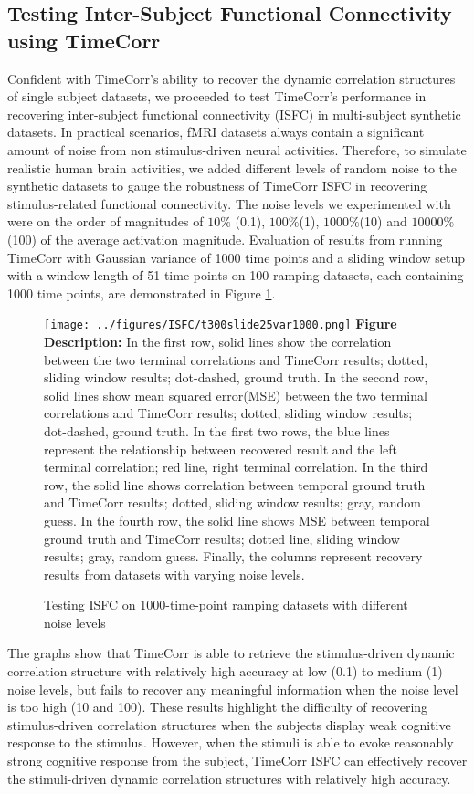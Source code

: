 \documentclass[11pt]{article}
\begin{document}
\subsection{Testing Inter-Subject Functional Connectivity using TimeCorr}
Confident with TimeCorr's ability to recover the dynamic correlation structures of single subject datasets, we proceeded to test TimeCorr's performance in recovering inter-subject functional connectivity (ISFC) in multi-subject synthetic datasets. In practical scenarios, fMRI datasets always contain a significant amount of noise from non stimulus-driven neural activities. Therefore, to simulate realistic human brain activities, we added different levels of random noise to the synthetic datasets to gauge the robustness of TimeCorr ISFC in recovering stimulus-related functional connectivity. The noise levels we experimented with were on the order of magnitudes of $10\%$ (0.1), $100\%$(1), $1000\%$(10) and $10000\%$(100) of the average activation magnitude. Evaluation of results from running TimeCorr with Gaussian variance of 1000 time points and a sliding window setup with a window length of 51 time points on 100 ramping datasets, each containing 1000 time points, are demonstrated in Figure \ref{fig:t300slide25var1000}.

\begin{figure}[!htb]
\caption{Testing ISFC on 1000-time-point ramping datasets with different noise levels}
\texttt{[image: ../figures/ISFC/t300slide25var1000.png]}
\label{fig:t300slide25var1000}
\small{\textbf{Figure Description:} In the first row, solid lines show the correlation between the two terminal correlations and TimeCorr results; dotted, sliding window results; dot-dashed, ground truth. In the second row, solid lines show mean squared error(MSE) between the two terminal correlations and TimeCorr results; dotted, sliding window results; dot-dashed, ground truth. In the first two rows, the blue lines represent the relationship between recovered result and the left terminal correlation; red line, right terminal correlation. In the third row, the solid line shows correlation between temporal ground truth and TimeCorr results; dotted, sliding window results; gray, random guess. In the fourth row, the solid line shows MSE between temporal ground truth and TimeCorr results; dotted line, sliding window results; gray, random guess. Finally, the columns represent recovery results from datasets with varying noise levels.}
\end{figure}

The graphs show that TimeCorr is able to retrieve the stimulus-driven dynamic correlation structure with relatively high accuracy at low (0.1) to medium (1) noise levels, but fails to recover any meaningful information when the noise level is too high (10 and 100). These results highlight the difficulty of recovering stimulus-driven correlation structures when the subjects display weak cognitive response to the stimulus. However, when the stimuli is able to evoke reasonably strong cognitive response from the subject, TimeCorr ISFC can effectively recover the stimuli-driven dynamic correlation structures with relatively high accuracy.
\end{document}

